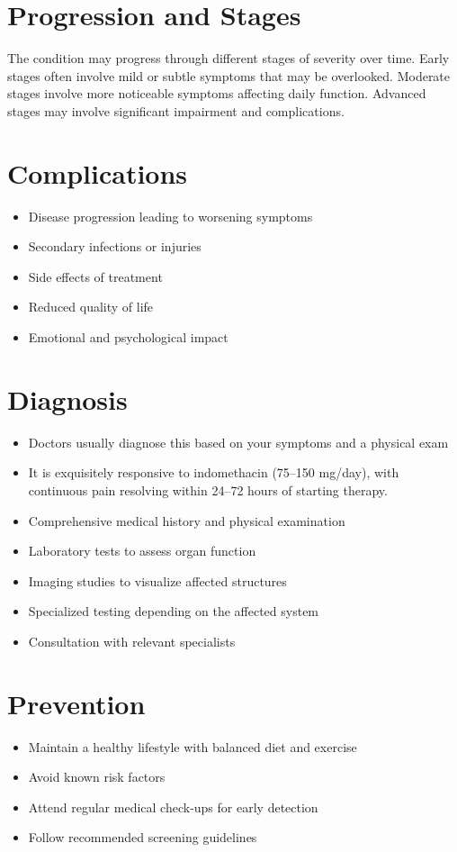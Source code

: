 \section{Progression and Stages}
The condition may progress through different stages of severity over time. Early stages often involve mild or subtle symptoms that may be overlooked. Moderate stages involve more noticeable symptoms affecting daily function. Advanced stages may involve significant impairment and complications.
\section{Complications}
\begin{itemize}[noitemsep]
  \item Disease progression leading to worsening symptoms
  \item Secondary infections or injuries
  \item Side effects of treatment
  \item Reduced quality of life
  \item Emotional and psychological impact
\end{itemize}
\section{Diagnosis}
\begin{itemize}[noitemsep]
  \item Doctors usually diagnose this based on your symptoms and a physical exam
  \item It is exquisitely responsive to indomethacin (75--150 mg/day), with continuous pain resolving within 24--72 hours of starting therapy.
  \item Comprehensive medical history and physical examination
  \item Laboratory tests to assess organ function
  \item Imaging studies to visualize affected structures
  \item Specialized testing depending on the affected system
  \item Consultation with relevant specialists
\end{itemize}
\section{Prevention}
\begin{itemize}[noitemsep]
  \item Maintain a healthy lifestyle with balanced diet and exercise
  \item Avoid known risk factors
  \item Attend regular medical check-ups for early detection
  \item Follow recommended screening guidelines
\end{itemize}
